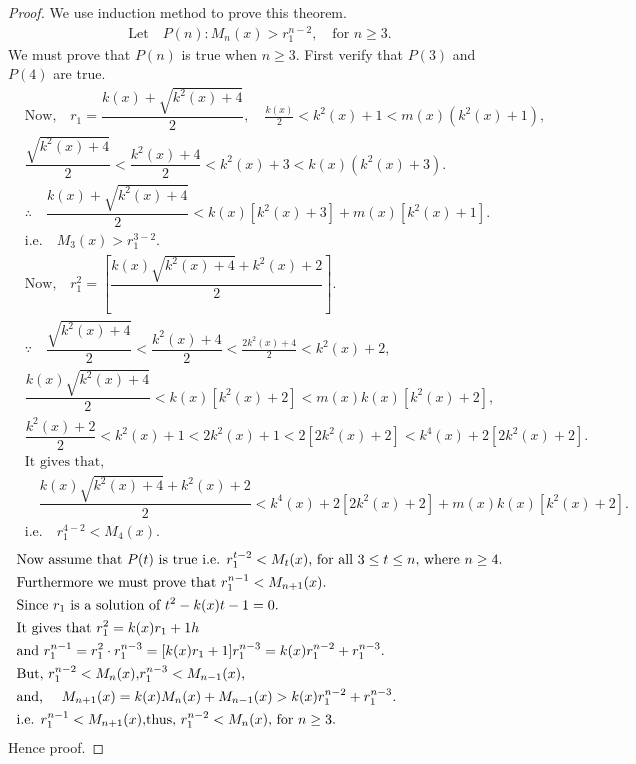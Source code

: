 \begin{proof}
We use induction method to prove this theorem.
\begin{align*}
\text{Let}\quad P(n):M_{n}(x)>r_{1}^{n-2}, \quad\text{for $n\geq3$}.
\end{align*}
We must prove that $P(n)$ is true when $n\geq3$. First verify that $P(3)$ and $P(4)$ are true.
\begin{align*}
&\text{Now,}\quad r_{1}=\dfrac{k(x)+\sqrt{k^2(x)+4}}{2},\quad \frac{k(x)}{2}<k^{2}(x)+1< m(x)(k^{2}(x)+1),\\
&\dfrac{\sqrt{k^{2}(x)+4}}{2}<\dfrac{k^{2}(x)+4}{2}<k^{2}(x)+3<k(x)(k^{2}(x)+3).\\
&\therefore\quad \dfrac{k(x)+\sqrt{k^{2}(x)+4}}{2}<k(x)[k^{2}(x)+3]+m(x)[k^2(x)+1].\\
&\text{i.e.}\quad M_{3}(x)>r_{1}^{3-2}.\\
&\text{Now,}\quad r_{1}^2=[\dfrac{k(x)\sqrt{k^2(x)+4}+k^2(x)+2}{2}].\\
&\because\quad\dfrac{\sqrt{k^2(x)+4}}{2}<\dfrac{k^2(x)+4}{2}<\frac{2k^2(x)+4}{2}<k^2(x)+2,
\end{align*}
\begin{align*}
&\dfrac{k(x)\sqrt{k^2(x)+4}}{2}<k(x)[k^2(x)+2]<m(x)k(x)[k^2(x)+2],\\
&\dfrac{k^2(x)+2}{2}<k^2(x)+1<2k^2(x)+1<2[2k^2(x)+2]<k^4(x)+2[2k^2(x)+2].\\
&\text{It gives that,}\\&\quad \dfrac{k(x)\sqrt{k^2(x)+4}+k^2(x)+2}{2}<k^4(x)+2[2k^2(x)+2]+m(x)k(x)[k^2(x)+2].\\
&\text{i.e.}\quad r_{1}^{4-2}<M_{4}(x).
\end{align*}
\begin{align*}
&\text{Now assume that $P(t)$ is true i.e. $r_{1}^{t-2}<M_{t}(x)$, for all $3\leq{t}\leq n,$ where $n\geq4$}.\\
&\text{Furthermore we must prove that $r_{1}^{n-1}<M_{n+1}(x)$.}\\
&\text{Since $r_{1}$ is a solution of $t^2-k(x)t-1=0$.}\\
&\text{It gives that $r_{1}^2=k(x)r_{1}+1h$}\\
&\text{and $r_{1}^{n-1}=r_{1}^2\cdot r_{1}^{n-3}=[k(x)r_{1}+1]r_{1}^{n-3}=k(x)r_{1}^{n-2}+r_{1}^{n-3}$.}\\
&\text{But, $r_{1}^{n-2}<M_{n}(x)$,} \text{$r_{1}^{n-3}<M_{n-1}(x)$,}\\
&\text{and, \quad $M_{n+1}(x)=k(x)M_{n}(x)+M_{n-1}(x)>k(x)r_{1}^{n-2}+r_{1}^{n-3}$.}\\
&\text{i.e. $r_{1}^{n-1}<M_{n+1}(x)$,}
\text{thus, $r_{1}^{n-2}< M_{n}(x)$, for $n\geq3$.}
\end{align*}
Hence proof.
\end{proof}
